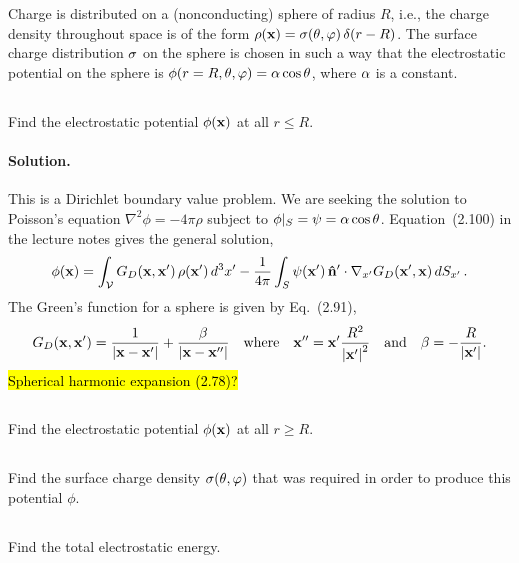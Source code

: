 \documentclass[11pt]{article}
\renewcommand{\vec}[1]{\mathbf{#1}}
\newcommand{\beq}{\begin{equation*}}
\newcommand{\eeq}{\end{equation*}}
\newenvironment{statement}[1]
{
	\section{#1}
	\color{darkgray}
	\ignorespaces
}
{
}
\newenvironment{problem}
{
	\subsection{}
	\color{darkgray}
    \ignorespaces
}
{

}
\newenvironment{solution}
{
    \paragraph{Solution.}
    \ignorespaces
}
{
    \bigskip
}
\begin{document}
\newcommand{\lap}{\nabla^2}
\newcommand{\Gd}{G_D}
\newcommand{\Gdxxp}{\Gd(\vx, \vx')}
\newcommand{\Gdxpx}{\Gd(\vx', \vx)}
\newcommand{\psixp}{\psi(\vx')}
\newcommand{\nh}{\vec{\hat{n}}}
\newcommand{\nabxp}{\nabla_{x'}}
\newcommand{\dSxp}{\dd{S_{x'}}}
\newcommand{\absxp}{\abs{\vx'}}

\begin{statement}{}
	Charge is distributed on a (nonconducting) sphere of radius $R$, i.e., the charge density throughout space is of the form $\rhox = \sig(\tht, \vph) \, \delta(r - R)$.  The surface charge distribution $\sigma$ on the sphere is chosen in such a way that the electrostatic potential on the sphere is $\phi(r=R, \theta, \varphi) = \alpha \cos\theta$, where $\alpha$ is a constant.
\end{statement}

\begin{problem}
	Find the electrostatic potential $\phix$ at all $r \leq R$.
\end{problem}

\begin{solution}
	This is a Dirichlet boundary value problem.  We are seeking the solution to Poisson's equation $\lap\phi = -4\pi\rho$ subject to $\phi|_S = \psi = \alpha \cos\theta$.  Equation~(2.100) in the lecture notes gives the general solution,
	\beq
		\phix = \intV \Gdxxp \, \rhoxp \dcxp - \frac{1}{4\pi} \intS \psixp \, \nh' \cdot \nabxp \Gdxpx \dSxp.
	\eeq
	The Green's function for a sphere is given by Eq.~(2.91),
	\beq
		\Gdxxp = \frac{1}{\abs{\vx - \vx'}} + \frac{\beta}{\abs{\vx - \vx''}} \qq{where} \vx'' = \vx' \frac{R^2}{\absxp^2} \qand \beta = - \frac{R}{\absxp}.
	\eeq
	\hl{Spherical harmonic expansion (2.78)?}
\end{solution}


\begin{problem}
	Find the electrostatic potential $\phix$ at all $r \geq R$.
\end{problem}

\begin{problem}
	Find the surface charge density $\sigma(\theta, \varphi)$ that was required in order to produce this potential $\phi$.
\end{problem}

\begin{problem}
	Find the total electrostatic energy.
\end{problem}



\newcommand{\vF}{\vec{F}}
\newcommand{\vE}{\vec{E}}
\newcommand{\rh}{\vec{\hat{r}}}
\newcommand{\thh}{\boldsymbol{\hat{\tht}}}
\newcommand{\phh}{\boldsymbol{\hat{\vph}}}
\newcommand{\nabx}{\nabla_x}
\end{document}
